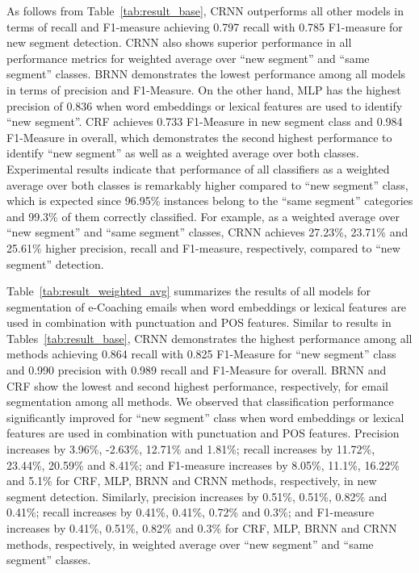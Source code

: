 \documentclass{amia}
\begin{document}
As follows from Table~\ref{tab:result_base}, CRNN outperforms all other models in terms of recall and F1-measure achieving 0.797 recall with 0.785 F1-measure for new segment detection. CRNN also shows superior performance in all performance metrics for weighted average over ``new segment'' and ``same segment'' classes. BRNN demonstrates the lowest performance among all models in terms of precision and F1-Measure. On the other hand, MLP has the highest precision of 0.836 when word embeddings or lexical features are used to identify ``new segment''. CRF achieves 0.733 F1-Measure in new segment class and 0.984 F1-Measure in overall, which demonstrates the second highest performance to identify ``new segment'' as well as a weighted average over both classes. Experimental results indicate that performance of all classifiers as a weighted average over both classes is remarkably higher compared to ``new segment'' class, which is expected since 96.95\% instances belong to the ``same segment'' categories and 99.3\% of them correctly classified. For example, as a weighted average over ``new segment'' and ``same segment'' classes, CRNN achieves 27.23\%, 23.71\% and 25.61\% higher precision, recall and F1-measure, respectively, compared to ``new segment'' detection. 

Table~\ref{tab:result_weighted_avg} summarizes the results of all models for segmentation of e-Coaching emails when word embeddings or lexical features are used in combination with punctuation and POS features. Similar to results in Tables~\ref{tab:result_base}, CRNN demonstrates the highest performance among all methods achieving 0.864 recall with 0.825 F1-Measure for ``new segment'' class and 0.990 precision with 0.989 recall and F1-Measure for overall. BRNN and CRF show the lowest and second highest performance, respectively, for email segmentation among all methods. We observed that classification performance significantly improved for ``new segment'' class when word embeddings or lexical features are used in combination with punctuation and POS features. Precision increases by 3.96\%, -2.63\%, 12.71\% and 1.81\%; recall increases by 11.72\%, 23.44\%, 20.59\% and 8.41\%; and F1-measure increases by 8.05\%, 11.1\%, 16.22\% and 5.1\% for CRF, MLP, BRNN and CRNN methods, respectively, in new segment detection. Similarly, precision increases by 0.51\%, 0.51\%, 0.82\% and 0.41\%; recall increases by 0.41\%, 0.41\%, 0.72\% and 0.3\%; and F1-measure increases by 0.41\%, 0.51\%, 0.82\% and 0.3\% for CRF, MLP, BRNN and CRNN methods, respectively, in weighted average over ``new segment'' and ``same segment'' classes.\\
\end{document}
